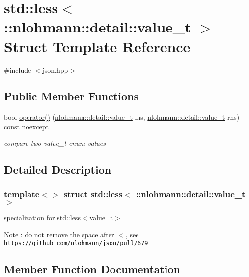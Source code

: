 \hypertarget{structstd_1_1less_3_01_1_1nlohmann_1_1detail_1_1value__t_01_4}{}\section{std\+:\+:less$<$ \+:\+:nlohmann\+:\+:detail\+:\+:value\+\_\+t $>$ Struct Template Reference}
\label{structstd_1_1less_3_01_1_1nlohmann_1_1detail_1_1value__t_01_4}


{\ttfamily \#include $<$json.\+hpp$>$}

\subsection*{Public Member Functions}
\begin{DoxyCompactItemize}
\item 
bool \hyperlink{structstd_1_1less_3_01_1_1nlohmann_1_1detail_1_1value__t_01_4_a76d2a6c170cfd74f3b1882be1b5a6671}{operator()} (\hyperlink{namespacenlohmann_1_1detail_a1ed8fc6239da25abcaf681d30ace4985}{nlohmann\+::detail\+::value\+\_\+t} lhs, \hyperlink{namespacenlohmann_1_1detail_a1ed8fc6239da25abcaf681d30ace4985}{nlohmann\+::detail\+::value\+\_\+t} rhs) const noexcept
\begin{DoxyCompactList}\small\item\em compare two value\+\_\+t enum values \end{DoxyCompactList}\end{DoxyCompactItemize}


\subsection{Detailed Description}
\subsubsection*{template$<$$>$\newline
struct std\+::less$<$ \+::nlohmann\+::detail\+::value\+\_\+t $>$}

specialization for std\+::less$<$value\+\_\+t$>$ \begin{DoxyNote}{Note}
\+: do not remove the space after \textquotesingle{}$<$\textquotesingle{}, see \href{https://github.com/nlohmann/json/pull/679}{\tt https\+://github.\+com/nlohmann/json/pull/679} 
\end{DoxyNote}


\subsection{Member Function Documentation}
\mbox{\label{structstd_1_1less_3_01_1_1nlohmann_1_1detail_1_1value__t_01_4_a76d2a6c170cfd74f3b1882be1b5a6671}} 
